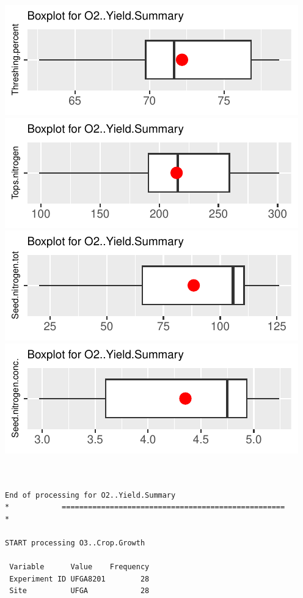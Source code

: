 \documentclass[
]{article}
\begin{document}
\includegraphics{FL_Crop_BMP_QA_single_dataset_files/figure-latex/check-content-of-sheets-29.pdf}
\includegraphics{FL_Crop_BMP_QA_single_dataset_files/figure-latex/check-content-of-sheets-30.pdf}
\includegraphics{FL_Crop_BMP_QA_single_dataset_files/figure-latex/check-content-of-sheets-31.pdf}
\includegraphics{FL_Crop_BMP_QA_single_dataset_files/figure-latex/check-content-of-sheets-32.pdf}

\begin{verbatim}


End of processing for O2..Yield.Summary
*            ===================================================            *

START processing O3..Crop.Growth

 Variable      Value    Frequency
 Experiment ID UFGA8201        28
 Site          UFGA            28
\end{verbatim}
\end{document}
